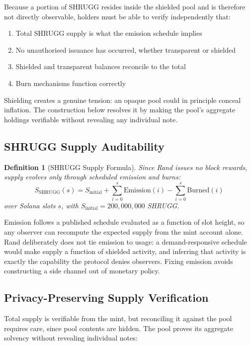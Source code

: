 \documentclass[11pt,a4paper]{article}
\newtheorem{definition}[theorem]{Definition}
\begin{document}
Because a portion of SHRUGG resides inside the shielded pool and is therefore not directly observable, holders must be able to verify independently that:
\begin{enumerate}
    \item Total SHRUGG supply is what the emission schedule implies
    \item No unauthorised issuance has occurred, whether transparent or shielded
    \item Shielded and transparent balances reconcile to the total
    \item Burn mechanisms function correctly
\end{enumerate}

Shielding creates a genuine tension: an opaque pool could in principle conceal inflation. The construction below resolves it by making the pool's aggregate holdings verifiable without revealing any individual note.

\subsection{SHRUGG Supply Auditability}

\begin{definition}[SHRUGG Supply Formula]
Since Rand issues no block rewards, supply evolves only through scheduled emission and burns:
\begin{equation}
S_{\text{SHRUGG}}(s) = S_{\text{initial}} + \sum_{i=0}^{s} \text{Emission}(i) - \sum_{i=0}^{s} \text{Burned}(i)
\end{equation}
over Solana slots $s$, with $S_{\text{initial}} = 200{,}000{,}000$ SHRUGG.
\end{definition}

Emission follows a published schedule evaluated as a function of slot height, so any observer can recompute the expected supply from the mint account alone. Rand deliberately does not tie emission to usage: a demand-responsive schedule would make supply a function of shielded activity, and inferring that activity is exactly the capability the protocol denies observers. Fixing emission avoids constructing a side channel out of monetary policy.

\subsection{Privacy-Preserving Supply Verification}

Total supply is verifiable from the mint, but reconciling it against the pool requires care, since pool contents are hidden. The pool proves its aggregate solvency without revealing individual notes:
\end{document}
